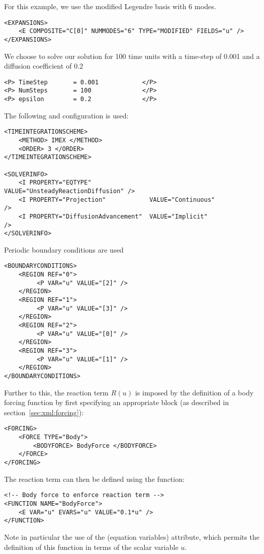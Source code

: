 For this example, we use the modified Legendre basis with 6 modes.
\begin{lstlisting}[style=XMLStyle]
<EXPANSIONS>
    <E COMPOSITE="C[0]" NUMMODES="6" TYPE="MODIFIED" FIELDS="u" />
</EXPANSIONS>
\end{lstlisting}

We choose to solve our solution for 100 time units with a time-step of 0.001 and a diffusion coefficient 
 of 0.2 
\begin{lstlisting}[style=XMLStyle]
<P> TimeStep       = 0.001            </P>
<P> NumSteps       = 100              </P>
<P> epsilon        = 0.2              </P>
\end{lstlisting}

The following  and  configuration is used:
\begin{lstlisting}[style=XMLStyle]
<TIMEINTEGRATIONSCHEME>
    <METHOD> IMEX </METHOD>
    <ORDER> 3 </ORDER>
</TIMEINTEGRATIONSCHEME>

<SOLVERINFO>
    <I PROPERTY="EQTYPE"                VALUE="UnsteadyReactionDiffusion" />
    <I PROPERTY="Projection"            VALUE="Continuous"                />
    <I PROPERTY="DiffusionAdvancement"  VALUE="Implicit"                  />
</SOLVERINFO>
\end{lstlisting}

Periodic boundary conditions are used 
\begin{lstlisting}[style=XMLStyle]
<BOUNDARYCONDITIONS>
    <REGION REF="0">
         <P VAR="u" VALUE="[2]" />
    </REGION>
    <REGION REF="1">
         <P VAR="u" VALUE="[3]" />
    </REGION>
    <REGION REF="2">
         <P VAR="u" VALUE="[0]" />
    </REGION>
    <REGION REF="3">
         <P VAR="u" VALUE="[1]" />
    </REGION>
</BOUNDARYCONDITIONS>
\end{lstlisting}

Further to this, the reaction term $R(u)$ is imposed by the definition of a body
forcing function by first specifying an appropriate 
block (as described in section~\ref{sec:xml:forcing}):
\begin{lstlisting}[style=XMLStyle]
<FORCING>
    <FORCE TYPE="Body">
        <BODYFORCE> BodyForce </BODYFORCE>
    </FORCE>
</FORCING>
\end{lstlisting}
The reaction term can then be defined using the function:
\begin{lstlisting}[style=XMLStyle]
<!-- Body force to enforce reaction term -->
<FUNCTION NAME="BodyForce">
    <E VAR="u" EVARS="u" VALUE="0.1*u" />
</FUNCTION>
\end{lstlisting}
Note in particular the use of the  (equation variables) attribute,
which permits the definition of this function in terms of the scalar variable
$u$. 


